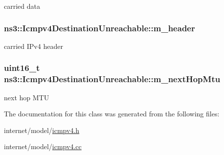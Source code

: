 carried data 

\subsubsection[{\texorpdfstring{m\+\_\+header}{m_header}}]{ ns3\+::\+Icmpv4\+Destination\+Unreachable\+::m\+\_\+header\hspace{0.3cm}{\ttfamily [private]}}\hypertarget{classns3_1_1Icmpv4DestinationUnreachable_a0cb91f22d5d2eada96abf2a9a9a31999}{}\label{classns3_1_1Icmpv4DestinationUnreachable_a0cb91f22d5d2eada96abf2a9a9a31999}


carried I\+Pv4 header 

\subsubsection[{\texorpdfstring{m\+\_\+next\+Hop\+Mtu}{m_nextHopMtu}}]{\setlength{\rightskip}{0pt plus 5cm}uint16\+\_\+t ns3\+::\+Icmpv4\+Destination\+Unreachable\+::m\+\_\+next\+Hop\+Mtu\hspace{0.3cm}{\ttfamily [private]}}\hypertarget{classns3_1_1Icmpv4DestinationUnreachable_a2619d7ba764eab941ee90343cd4f8395}{}\label{classns3_1_1Icmpv4DestinationUnreachable_a2619d7ba764eab941ee90343cd4f8395}


next hop M\+TU 



The documentation for this class was generated from the following files\+:\begin{DoxyCompactItemize}
\item 
internet/model/\hyperlink{icmpv4_8h}{icmpv4.\+h}\item 
internet/model/\hyperlink{icmpv4_8cc}{icmpv4.\+cc}\end{DoxyCompactItemize}
